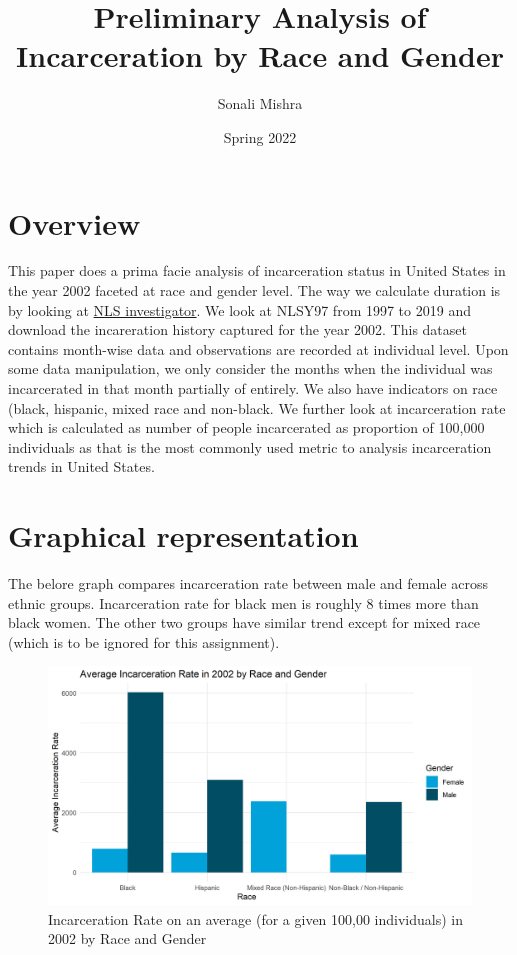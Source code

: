 \documentclass{article}
\author{Sonali Mishra}
\title{Preliminary Analysis of Incarceration by Race and Gender}
\date{Spring 2022}
\begin{document}
\maketitle

\section{Overview}

This paper does a prima facie analysis of incarceration status in United States in the year 2002 faceted at race and gender level. The way we calculate duration is by looking at \href{https://www.nlsinfo.org/investigator/pages/search}{NLS investigator}. We look at NLSY97 from 1997 to 2019 and download the incareration history captured for the year 2002. This dataset contains month-wise data and observations are recorded at individual level. Upon some data manipulation, we only consider the months when the individual was incarcerated in that month partially of entirely. We also have indicators on race (black, hispanic, mixed race and non-black. We further look at incarceration rate which is calculated as number of people incarcerated as proportion of 100,000 individuals as that is the most commonly used metric to analysis incarceration trends in United States.

\section{Graphical representation}

The belore graph compares incarceration rate between male and female across ethnic groups. Incarceration rate for black men is roughly 8 times more than black women. The other two groups have similar trend except for mixed race (which is to be ignored for this assignment). 

\begin{figure}[H]
    \begin{center}
        \includegraphics[width=.85\textwidth]{incar_rate_by_racegender}
    \end{center}
    \caption{Incarceration Rate on an average (for a given 100,00 individuals) in 2002 by Race and Gender}
    \label{fig:graph}
\end{figure}
\end{document}
